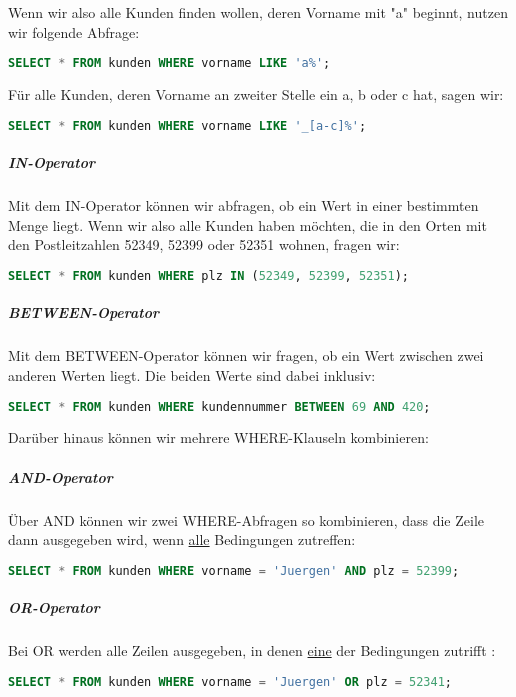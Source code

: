 \documentclass{article}
\begin{document}
	Wenn wir also alle Kunden finden wollen, deren Vorname mit "a" beginnt, nutzen wir folgende Abfrage:

	\begin{lstlisting}[language=SQL]
	SELECT * FROM kunden WHERE vorname LIKE 'a%';
	\end{lstlisting}

	Für alle Kunden, deren Vorname an zweiter Stelle ein a, b oder c hat, sagen wir:

	\begin{lstlisting}[language=SQL]
	SELECT * FROM kunden WHERE vorname LIKE '_[a-c]%';
	\end{lstlisting}

	\subparagraph{IN-Operator}
	Mit dem IN-Operator können wir abfragen, ob ein Wert in einer bestimmten Menge liegt. Wenn wir also alle Kunden haben möchten, die in den Orten mit den Postleitzahlen 52349, 52399 oder 52351 wohnen, fragen wir:

	\begin{lstlisting}[language=SQL]
	SELECT * FROM kunden WHERE plz IN (52349, 52399, 52351);
	\end{lstlisting}

	\subparagraph{BETWEEN-Operator}
	Mit dem BETWEEN-Operator können wir fragen, ob ein Wert zwischen zwei anderen Werten liegt. Die beiden Werte sind dabei inklusiv:

	\begin{lstlisting}[language=SQL]
	SELECT * FROM kunden WHERE kundennummer BETWEEN 69 AND 420;
	\end{lstlisting}

	Darüber hinaus können wir mehrere WHERE-Klauseln kombinieren:

	\subparagraph{AND-Operator}
	Über AND können wir zwei WHERE-Abfragen so kombinieren, dass die Zeile dann ausgegeben wird, wenn \underline{alle} Bedingungen zutreffen:

	\begin{lstlisting}[language=SQL, caption=Abfrage aller Kunden namens "Jürgen" in 52399]
	SELECT * FROM kunden WHERE vorname = 'Juergen' AND plz = 52399;
	\end{lstlisting}

	\subparagraph{OR-Operator}
	Bei OR werden alle Zeilen ausgegeben, in denen \underline{eine} der Bedingungen zutrifft :

	\begin{lstlisting}[language=SQL, caption=Abfrage aller Kunden mit Vorname "Jürgen" oder PLZ 52341]
	SELECT * FROM kunden WHERE vorname = 'Juergen' OR plz = 52341;
	\end{lstlisting}
\end{document}

